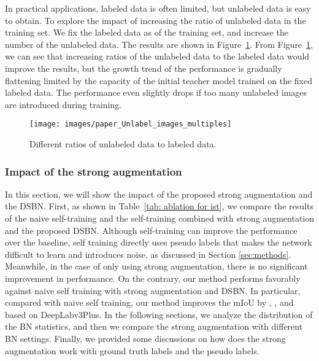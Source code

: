 \documentclass[10pt,twocolumn,letterpaper]{article}
\begin{document}
{In practical applications, labeled data is often limited, but unlabeled data is easy to obtain.  
To explore the impact of increasing the ratio of unlabeled data in the training set.
We fix the labeled data as 
of the training set, and increase the number of the unlabeled data. The results are shown in Figure~\ref{fig:paper_Unlabel_images_multiples}.
From Figure~\ref{fig:paper_Unlabel_images_multiples}, we can see that increasing ratios of the unlabeled data to the labeled data would  improve the results, but the growth trend of the performance is gradually flattening limited by the capacity of the initial teacher model trained on the fixed labeled data. The performance even slightly drops if too many unlabeled images are introduced during training.



\begin{figure}[t]
  \centering
    \texttt{[image: images/paper\_Unlabel\_images\_multiples]}
  \caption{Different ratios of unlabeled data to labeled data. 
  }
	\label{fig:paper_Unlabel_images_multiples}
	\vspace{-1em}
\end{figure}




\subsubsection{Impact of the strong augmentation}

In this section, we will show the impact of the proposed strong augmentation and the DSBN. First, as shown in Table~\ref{tab: ablation for ist}, we compare the results of the naive self-training and the self-training combined with strong augmentation and the proposed DSBN. Although self-training can improve the performance over the baseline, 
self training directly uses pseudo labels that makes the network difficult to learn and introduces noise, as discussed in Section \ref{sec:methods}. Meanwhile, in the case of only using strong augmentation, there is no significant improvement in performance.
On the contrary, our method performs favorably against naive self training with strong augmentation and DSBN. In particular, compared with naive self training, our method improves the mIoU by , ,  and  based on DeepLabv3Plus. In the following sections, we  analyze  the distribution of the BN statistics, and then we compare the strong augmentation with different BN settings. Finally, we provided some discussions on how does the strong augmentation work with ground truth labels and the pseudo labels.

}
\end{document}
